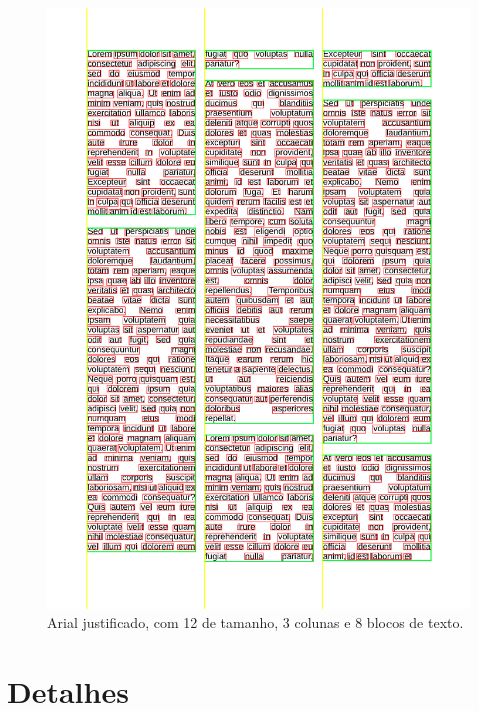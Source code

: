 \documentclass[english, 
               brazil, 
               bsc] %
               {dcomp-abntex2}
\begin{document}
\begin{figure}[H]
        \caption{\label{arial} \small Arial justificado, com 12 de tamanho, 3 colunas e 8 blocos de texto.}
        \begin{center}
            \includegraphics[scale=0.55]{./images/arial_justificado_tamanho_12_colunas_3_blocos_8_linhas_52_palavras_557.png}
        \end{center}
\end{figure}


\section{Detalhes}
\end{document}
